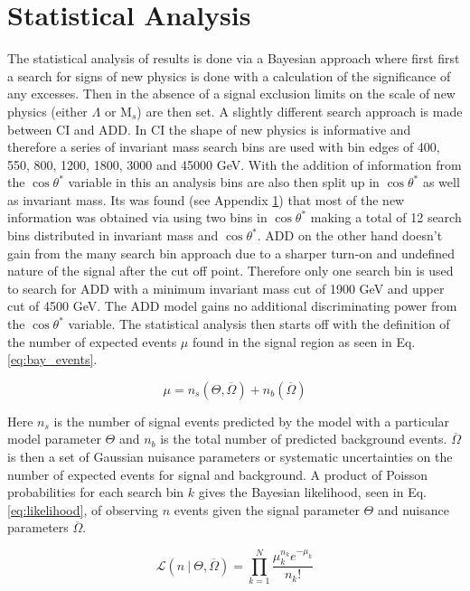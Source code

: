 \chapter{Statistical Analysis}

	The statistical analysis of results is done via a Bayesian approach where first first a search for signs of new physics is done with a calculation of the significance of any excesses. Then in the absence of a signal exclusion limits on the scale of new physics (either $\Lambda$ or M$_{s}$) are then set. A slightly different search approach is made between CI and ADD. In CI the shape of new physics is informative and therefore a series of invariant mass search bins are used with bin edges of 400, 550, 800, 1200, 1800, 3000 and 45000 GeV. With the addition of information from the $\cos{\theta^{*}}$ variable in this an analysis bins are also then split up in $\cos{\theta^{*}}$ as well as invariant mass. Its was found (see Appendix \ref{}) that most of the new information was obtained via using two bins in $\cos{\theta^{*}}$ making a total of 12 search bins distributed in invariant mass and $\cos{\theta^{*}}$. ADD on the other hand doesn't gain from the many search bin approach due to a sharper turn-on and undefined nature of the signal after the cut off point. Therefore only one search bin is used to search for ADD with a minimum invariant mass cut of 1900 GeV and upper cut of 4500 GeV. The ADD model gains no additional discriminating power from the $\cos{\theta^{*}}$ variable. The statistical analysis then starts off with the definition of the number of expected events $\mu$ found in the signal region as seen in Eq. \ref{eq:bay_events}.

	\begin{equation}
		\mu = n_{s}(\Theta,\overline{\Omega}) + n_{b}(\overline{\Omega})
    	\label{eq:bay_events}
    \end{equation}

    Here $n_{s}$ is the number of signal events predicted by the model with a particular model parameter $\Theta$ and $n_{b}$ is the total number of predicted background events. $\overline{\Omega}$ is then a set of Gaussian nuisance parameters or systematic uncertainties on the number of expected events for signal and background. A product of Poisson probabilities for each search bin $k$ gives the Bayesian likelihood, seen in Eq. \ref{eq:likelihood}, of observing $n$ events given the signal parameter $\Theta$ and nuisance parameters $\overline{\Omega}$.

	\begin{equation}
		\mathcal{L}(n~|~\Theta,\overline{\Omega}) = \prod\limits^{N}_{k=1}{\frac{\mu^{n_{k}}_{k} e^{-\mu_{k}}}{n_{k}!}}
    	\label{eq:likelihood}
    \end{equation}

